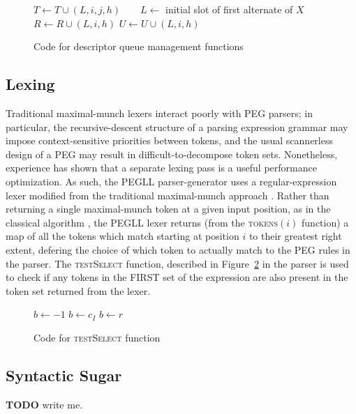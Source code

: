 \documentclass{article}
\begin{document}
\begin{figure}
\caption{Code for descriptor queue management functions} \label{add-match-fail}
\begin{algorithmic}
	\State $T \gets T \cup {(L, i, j, h)}$
		\State {}
	\Else
		\State {}
	\EndIf
\EndFunction
\State ~
		\State {}
	\Else
		\State {}
	\EndIf
\EndFunction
\State ~
	\State $L \gets$ initial slot of first alternate of $X$
	\State {}
\EndFunction
\State ~
		\State $R \gets R \cup {(L,i,h)}$
		\State $U \gets U \cup {(L,i,h)}$
	\EndIf
\EndFunction
\end{algorithmic}
\end{figure}

\subsection{Lexing}
Traditional maximal-munch lexers interact poorly with PEG parsers; in particular, the recursive-descent structure of a parsing expression grammar may impose context-sensitive priorities between tokens, and the usual scannerless design of a PEG may result in difficult-to-decompose token sets. 
Nonetheless, experience \cite{Ack19,Lau19} has shown that a separate lexing pass is a useful performance optimization.
As such, the PEGLL parser-generator uses a regular-expression lexer modified from the traditional maximal-munch approach \cite{Aetc07}. 
Rather than returning a single maximal-munch token at a given input position, as in the classical algorithm , the PEGLL lexer returns (from the \textsc{tokens}$(i)$ function) a map of all the tokens which match starting at position $i$ to their greatest right extent, defering the choice of which token to actually match to the PEG rules in the parser. 
The \textsc{testSelect} function, described in Figure~\ref{test-select} in the parser is used to check if any tokens in the FIRST set of the expression \cite{Red09} are also present in the token set returned from the lexer.

\begin{figure}
\caption[testSelect]{Code for \textsc{testSelect} function} \label{test-select}
\begin{algorithmic}
	\State $b \gets -1$
	 $b \gets c_I$ \EndIf
		 $b \gets r$ \EndIf
	\EndFor
	\State {}
\EndFunction
\end{algorithmic}
\end{figure}

\subsection{Syntactic Sugar} \label{syntax-sec}

\textbf{TODO} write me.



\end{document}
